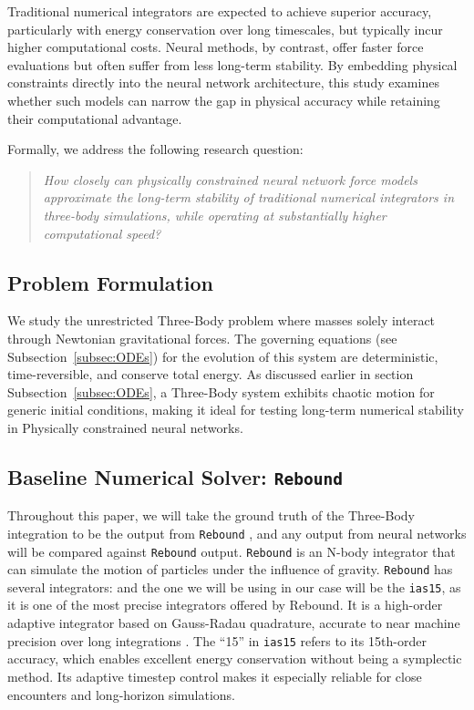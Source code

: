 \documentclass[12pt,a4paper]{article}
\begin{document}
Traditional numerical integrators are expected to achieve superior accuracy, particularly with energy conservation over long timescales, but typically incur higher computational costs. Neural methods, by contrast, offer faster force evaluations but often suffer from less long-term stability. By embedding physical constraints directly into the neural network architecture, this study examines whether such models can narrow the gap in physical accuracy while retaining their computational advantage.

Formally, we address the following research question:
\begin{quote}
\emph{How closely can physically constrained neural network force models approximate the long-term stability of traditional numerical integrators in three-body simulations, while operating at substantially higher computational speed?}
\end{quote}

\subsection{Problem Formulation}
We study the unrestricted Three-Body problem where masses solely interact through Newtonian gravitational forces. The governing equations (see Subsection~\ref{subsec:ODEs}) for the evolution of this system are deterministic, time-reversible, and conserve total energy. As discussed earlier in section Subsection~\ref{subsec:ODEs}, a Three-Body system exhibits chaotic motion for generic initial conditions, making it ideal for testing long-term numerical stability in Physically constrained neural networks.

\subsection{Baseline Numerical Solver: \texttt{Rebound}}
Throughout this paper, we will take the ground truth of the Three-Body integration to be the output from \texttt{Rebound} \citep{Rein2012}, and any output from neural networks will be compared against \texttt{Rebound} output. \texttt{Rebound} is an N-body integrator that can simulate the motion of particles under the influence of gravity. \texttt{Rebound} has several integrators: and the one we will be using in our case will be the \texttt{ias15}, \cite{Rein_2014} as it is one of the most precise integrators offered by Rebound. It is a high-order adaptive integrator based on Gauss-Radau quadrature, accurate to near machine precision over long integrations \citep{Rein_2014}. The ``15'' in \texttt{ias15} refers to its 15th-order accuracy, which enables excellent energy conservation without being a symplectic method. Its adaptive timestep control makes it especially reliable for close encounters and long-horizon simulations.
\end{document}
